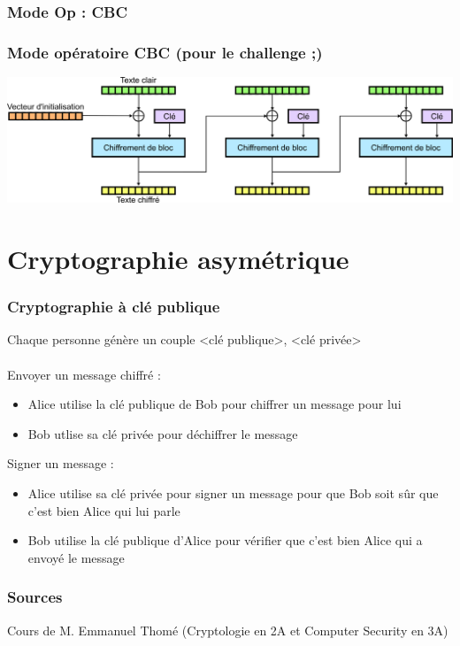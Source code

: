 \documentclass{beamer}
\begin{document}
    \subsubsection{Mode Op : CBC}

    \begin{frame}
        \frametitle{Mode opératoire CBC (pour le challenge ;)}

        \begin{center} \includegraphics[scale=0.23]{figures/schema_cbc.jpg} \end{center}

    \end{frame}

    \section[Cryptographie asymétrique]{Cryptographie asymétrique}

    \begin{frame}
        \frametitle{Cryptographie à clé publique}

        Chaque personne génère un couple <clé publique>, <clé privée> \\~\\

        Envoyer un message chiffré :

        \begin{itemize}
            \item Alice utilise la clé publique de Bob pour chiffrer un message pour lui
            \item Bob utlise sa clé privée pour déchiffrer le message
        \end{itemize}

        Signer un message :
        \begin{itemize}
            \item Alice utilise sa clé privée pour signer un message pour que Bob soit sûr que c'est bien Alice qui lui parle
            \item Bob utilise la clé publique d'Alice pour vérifier que c'est bien Alice qui a envoyé le message
        \end{itemize}
    \end{frame}

    \begin{frame}
        \frametitle{Sources}
        Cours de M. Emmanuel Thomé (Cryptologie en 2A et Computer Security en 3A)
    \end{frame}
\end{document}
